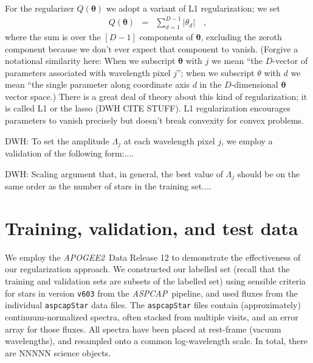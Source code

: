 \documentclass[12pt,preprint]{aastex}
\newcommand{\project}[1]{\textsl{#1}}
\newcommand{\acronym}[1]{{\small{#1}}}
\newcommand{\apogee}{\project{\acronym{APOGEE2}}}
\newcommand{\aspcap}{\project{\acronym{ASPCAP}}}
\newcommand{\Dvector}[1]{\boldsymbol{#1}}
\newcommand{\vectheta}{\Dvector{\theta}}
\newcommand{\vecv}{\Dvector{v}}
\begin{document}

For the regularizer $Q(\vectheta)$ we adopt a variant of L1
regularization; we set
\begin{eqnarray}
  Q(\vectheta) &=& \sum_{d=1}^{D-1} |\theta_d|
  \quad,
\end{eqnarray}
where the sum is over the $[D-1]$ components of $\vectheta$, excluding
the zeroth component because we don't ever expect that component to
vanish.
(Forgive a notational similarity here: When we subscript $\vectheta$ with
$j$ we mean ``the $D$-vector of parameters associated with wavelength
pixel $j$''; when we subscript $\theta$ with $d$ we mean ``the single
parameter along coordinate axis $d$ in the $D$-dimensional $\vectheta$
vector space.)
There is a great deal of theory about this kind of regularization; it
is called L1 or the lasso (DWH CITE STUFF).
L1 regularization encourages parameters to vanish precisely but
doesn't break convexity for convex problems.

DWH: To set the amplitude $\Lambda_j$ at each wavelength pixel $j$, we
employ a validation of the following form:....

DWH: Scaling argument that, in general, the best value of $\Lambda_j$
should be on the same order as the number of stars in the training
set....

\section{Training, validation, and test data}


We employ the \apogee\ Data Release 12 to demonstrate the effectiveness of our 
regularization approach.   We constructed our labelled set (recall that the training and validation sets are subsets of the labelled set) using sensible criteria for  
stars in version \texttt{v603} from the \aspcap\ 
pipeline, and used fluxes from the individual \texttt{aspcapStar} data files.
The \texttt{aspcapStar} files contain (approximately) continuum-normalized 
spectra, often stacked from multiple visits, and an error array for those 
fluxes.  All spectra have been placed at rest-frame (vacuum wavelengths), and
resampled onto a common log-wavelength scale. In total, there are NNNNN science
objects.
\end{document}
